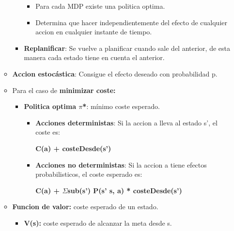 \documentclass[12pt, twoside, openright]{report} %
\begin{document}
\begin{itemize}
\begin{itemize}
\begin{itemize}
\begin{itemize}
        \item Para cada MDP existe una politica optima.
          
        \item Determina que hacer independientemente del efecto de cualquier
          accion en cualquier instante de tiempo.
          
        \end{itemize}
      \item \textbf{Replanificar}: Se vuelve a planificar cuando sale del
        anterior, de esta manera cada estado tiene en cuenta el
        anterior.
        
      \end{itemize}
    \item \textbf{Accion estocástica}: Consigue el efecto deseado con
      probabilidad p.
      
    \item Para el caso de \textbf{minimizar coste:}
      

      \begin{itemize}
      \item \textbf{Politica optima $\pi$*}: mínimo coste esperado.
        

        \begin{itemize}
        \item \textbf{Acciones deterministas}: Si la accion a lleva al
          estado s', el coste es:
          

         
		  
            \textbf{C(a) + costeDesde(s')}
          
			
        \item \textbf{Acciones no deterministas}: Si la accion a tiene
          efectos probabilisticos, el coste esperado es:
          

          
		  
            \textbf{C(a) + $\Sigma$sub(s') P(s'\textbar{} s, a) *
            costeDesde(s')}
          
			
        \end{itemize}
      \end{itemize}
    \item \textbf{Funcion de valor:} coste esperado de un estado.
      

      \begin{itemize}
      \item \textbf{V(s):} coste esperado de alcanzar la meta desde s.
        

\end{itemize}
\end{itemize}
\end{itemize}
\end{document}
